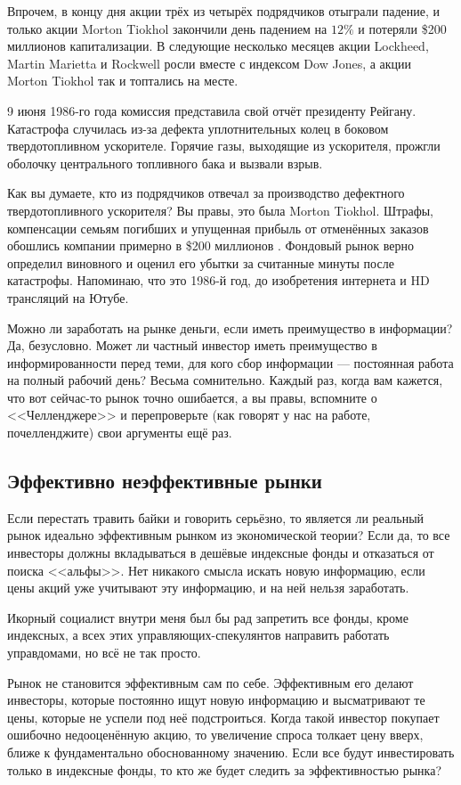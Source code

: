 Впрочем, в концу дня акции трёх из четырёх подрядчиков 
отыграли падение, и только акции Morton Tiokhol закончили день падением на
$12\%$ и потеряли \$200 миллионов капитализации. В следующие несколько месяцев 
акции Lockheed, Martin Marietta и Rockwell росли вместе с индексом Dow 
Jones, а акции Morton Tiokhol так и топтались на месте.

9 июня 1986-го года комиссия представила свой отчёт президенту Рейгану. 
Катастрофа случилась из-за дефекта уплотнительных колец в боковом 
твердотопливном ускорителе. Горячие газы, выходящие из ускорителя, прожгли 
оболочку центрального топливного бака и вызвали взрыв.

Как вы думаете, кто из подрядчиков отвечал за производство дефектного 
твердотопливного ускорителя? Вы правы, это была Morton Tiokhol. Штрафы, 
компенсации семьям погибших и упущенная прибыль от отменённых заказов обошлись 
компании примерно в \$200 миллионов \cite{maloney2003complexity}. Фондовый рынок 
верно определил виновного и оценил его убытки за считанные минуты после 
катастрофы. Напоминаю, что это 1986-й год, до изобретения интернета и HD
трансляций на Ютубе.

Можно ли заработать на рынке деньги, если иметь преимущество в информации? Да,
безусловно. Может ли частный инвестор иметь преимущество в информированности 
перед теми, для кого сбор информации --- постоянная работа на полный рабочий 
день? Весьма сомнительно. Каждый раз, когда вам кажется, что вот сейчас-то рынок
точно ошибается, а вы правы, вспомните о <<Челленджере>> и перепроверьте (как 
говорят у нас на работе, почелленджите) свои аргументы ещё раз.

\subsection{Эффективно неэффективные рынки}

Если перестать травить байки и говорить серьёзно, то является ли реальный рынок 
идеально эффективным рынком из экономической теории? Если да, то все инвесторы 
должны вкладываться в дешёвые индексные фонды и отказаться от поиска <<альфы>>. 
Нет никакого смысла искать новую информацию, если цены акций уже учитывают эту 
информацию, и на ней нельзя заработать. 

Икорный социалист внутри меня был бы рад запретить все фонды, кроме индексных, а 
всех этих управляющих-спекулянтов направить работать управдомами, но всё не так 
просто.

Рынок не становится эффективным сам по себе. Эффективным его делают 
инвесторы, которые постоянно ищут новую информацию и высматривают те цены, 
которые не успели под неё подстроиться. Когда такой инвестор покупает ошибочно 
недооценённую акцию, то увеличение спроса толкает цену вверх, ближе к 
фундаментально обоснованному значению. Если все будут инвестировать только в 
индексные фонды, то кто же будет следить за эффективностью рынка?

